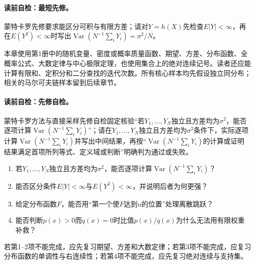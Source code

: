 \label{struct:V5-C02-CH02}
\paragraph{读前自检：最短先修。}蒙特卡罗先修要求能区分可积与有限方差；请对$Y=h(X)$先检查$E|Y|<\infty$，再在$E(Y^2)<\infty$时写出$\operatorname{Var}(N^{-1}\sum_iY_i)=\sigma^2/N$。\par

\begin{prerequisitebox}
本章使用第1册中的随机变量、密度或概率质量函数、期望、方差、分布函数、全概率公式、大数定律与中心极限定理，也使用集合上的绝对连续记号。读者还应能计算有限和、定积分和二分查找的迭代次数。所有核心样本均先假设独立同分布；相关的马尔可夫链样本留到后续章节。
\end{prerequisitebox}

\label{struct:V5-C02-CH03}
\paragraph{读前自检：先修自检。}蒙特卡罗方法与直接采样先修自检固定核验“若$Y_1,\ldots,Y_N$独立且方差均为$\sigma^2$，能否逐项计算$\operatorname{Var}(N^{-1}\sum_iY_i)$”；请在$Y_1,\ldots,Y_N$独立且方差均为$\sigma^2$条件下，实际逐项计算$\operatorname{Var}(N^{-1}\sum_iY_i)$并写出中间结果，再按“$\operatorname{Var}(N^{-1}\sum_iY_i)$的计算或证明结果满足首项所列等式、定义域或判断”明确判为通过或失败。\par

\begin{precheckbox}
\begin{enumerate}[leftmargin=2.2em]
  \item 若$Y_1,\ldots,Y_N$独立且方差均为$\sigma^2$，能否逐项计算$\operatorname{Var}(N^{-1}\sum_iY_i)$？
  \item 能否区分条件$E|Y|<\infty$与$E(Y^2)<\infty$，并说明后者为何更强？
  \item 给定分布函数$F$，能否用“第一个使$F$达到$u$的位置”处理离散跳跃？
  \item 能否判断$p(x)>0$而$q(x)=0$时比值$p(x)/q(x)$为什么无法用有限权重补救？
\end{enumerate}
若第1--2项不能完成，应先复习期望、方差和大数定律；若第3项不能完成，应复习分布函数的单调性与右连续性；若第4项不能完成，应先复习绝对连续与支持集。
\end{precheckbox}

\label{struct:V5-C02-CH04}
